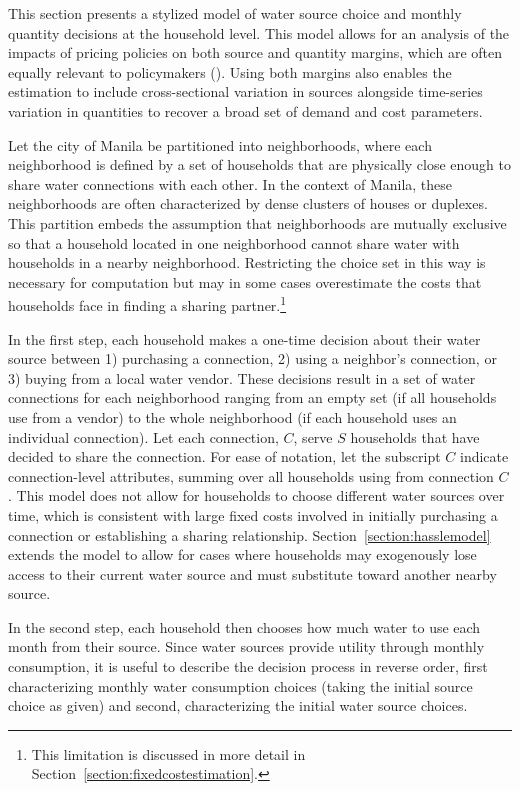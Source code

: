 \documentclass[12pt]{article}
\begin{document}
This section presents a stylized model of water source choice and monthly quantity decisions at the household level.  This model allows for an analysis of the impacts of pricing policies on both source and quantity margins, which are often equally relevant to policymakers (\cite{mcintosh2003asian,komives2005water}).  Using both margins also enables the estimation to include cross-sectional variation in sources alongside time-series variation in quantities to recover a broad set of demand and cost parameters.

Let the city of Manila be partitioned into neighborhoods, where each neighborhood is defined by a set of households that are physically close enough to share water connections with each other.  In the context of Manila, these neighborhoods are often characterized by dense clusters of houses or duplexes.  This partition embeds the assumption that neighborhoods are mutually exclusive so that a household located in one neighborhood cannot share water with households in a nearby neighborhood.  Restricting the choice set in this way is necessary for computation but may in some cases overestimate the costs that households face in finding a sharing partner.\footnote{This limitation is discussed in more detail in Section~\ref{section:fixedcostestimation}.}

In the first step, each household makes a one-time decision about their water source between 1) purchasing a connection, 2) using a neighbor's connection, or 3) buying from a local water vendor.  These decisions result in a set of water connections for each neighborhood ranging from an empty set (if all households use from a vendor) to the whole neighborhood (if each household uses an individual connection).  Let each connection, $C$, serve $S$ households that have decided to share the connection.  For ease of notation, let the subscript $C$ indicate connection-level attributes, summing over all households using from connection $C$.  This model does not allow for households to choose different water sources over time, which is consistent with large fixed costs involved in initially purchasing a connection or establishing a sharing relationship.  Section~\ref{section:hasslemodel} extends the model to allow for cases where households may exogenously lose access to their current water source and must substitute toward another nearby source.

In the second step, each household then chooses how much water to use each month from their source.  Since water sources provide utility through monthly consumption, it is useful to describe the decision process in reverse order, first characterizing monthly water consumption choices (taking the initial source choice as given) and second, characterizing the initial water source choices.
\end{document}

